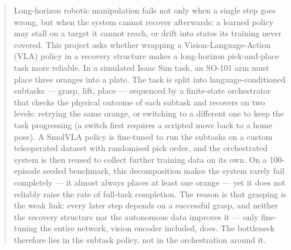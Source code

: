 \begin{abstract}
Long-horizon robotic manipulation fails not only when a single step goes wrong, but when the system cannot recover afterwards: a learned policy may stall on a target it cannot reach, or drift into states its training never covered. This project asks whether wrapping a Vision-Language-Action (VLA) policy in a recovery structure makes a long-horizon pick-and-place task more reliable. In a simulated Isaac Sim task, an SO-101 arm must place three oranges into a plate. The task is split into language-conditioned subtasks --- grasp, lift, place --- sequenced by a finite-state orchestrator that checks the physical outcome of each subtask and recovers on two levels: retrying the same orange, or switching to a different one to keep the task progressing (a switch first requires a scripted move back to a home pose). A SmolVLA policy is fine-tuned to run the subtasks on a custom teleoperated dataset with randomised pick order, and the orchestrated system is then reused to collect further training data on its own. On a 100-episode seeded benchmark, this decomposition makes the system rarely fail completely --- it almost always places at least one orange --- yet it does not reliably raise the rate of full-task completion. The reason is that grasping is the weak link: every later step depends on a successful grasp, and neither the recovery structure nor the autonomous data improves it --- only fine-tuning the entire network, vision encoder included, does. The bottleneck therefore lies in the subtask policy, not in the orchestration around it.

\end{abstract}

